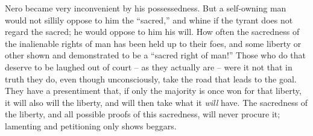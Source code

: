 Nero became very inconvenient by his possessedness. But a self-owning man 
would not sillily oppose to him the ``sacred,'' and whine if the tyrant does 
not regard the sacred; he would oppose to him his will. How often the 
sacredness of the inalienable rights of man has been held up to their foes, 
and some liberty or other shown and demonstrated to be a ``sacred right of 
man!'' Those who do that deserve to be laughed out of court -- as they 
actually are -- were it not that in truth they do, even though unconsciously, 
take the road that leads to the goal. They have a presentiment that, if only 
the majority is once won for that liberty, it will also will the liberty, and 
will then take what it \textit{will} have. The sacredness of the liberty, and 
all possible proofs of this sacredness, will never procure it; lamenting and 
petitioning only shows beggars.


